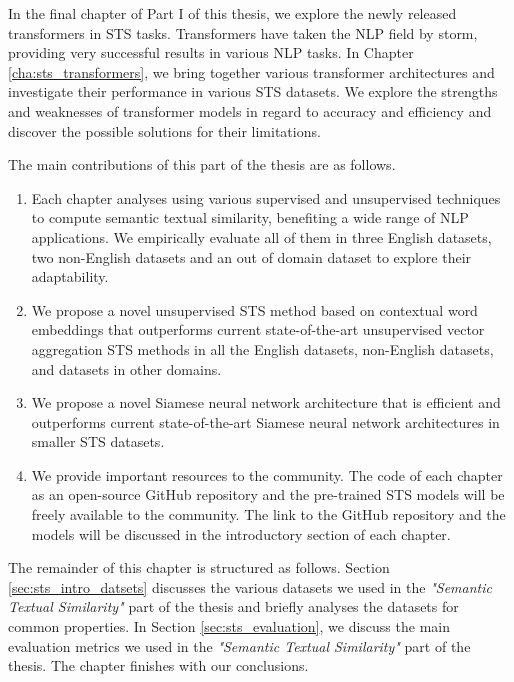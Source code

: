 In the final chapter of Part I of this thesis, we explore the newly released transformers in STS tasks. Transformers have taken the NLP field by storm, providing very successful results in various NLP tasks. In Chapter \ref{cha:sts_transformers}, we bring together various transformer architectures \autocite{devlin-etal-2019-bert,yang2019xlnet,liu2019roberta} and investigate their performance in various STS datasets. We explore the strengths and weaknesses of transformer models in regard to accuracy and efficiency and discover the possible solutions for their limitations.


The main contributions of this part of the thesis are as follows.

\begin{enumerate}
	\item Each chapter analyses using various supervised and unsupervised techniques to compute semantic textual similarity, benefiting a wide range of NLP applications. We empirically evaluate all of them in three English datasets, two non-English datasets and an out of domain dataset to explore their adaptability.  
	
	\item We propose a novel unsupervised STS method based on contextual word embeddings that outperforms current state-of-the-art unsupervised vector aggregation STS methods in all the English datasets, non-English datasets, and datasets in other domains.
	
	\item We propose a novel Siamese neural network architecture that is efficient and outperforms current state-of-the-art Siamese neural network architectures in smaller STS datasets. 
	
	\item We provide important resources to the community. The code of each chapter as an open-source GitHub repository and the pre-trained STS models will be freely available to the community. The link to the GitHub repository and the models will be discussed in the introductory section of each chapter. 
\end{enumerate}

The remainder of this chapter is structured as follows. Section \ref{sec:sts_intro_datsets} discusses the various datasets we used in the \textit{"Semantic Textual Similarity"} part of the thesis and briefly analyses the datasets for common properties. In Section \ref{sec:sts_evaluation}, we discuss the main evaluation metrics we used in the \textit{"Semantic Textual Similarity"} part of the thesis. The chapter finishes with our conclusions.


